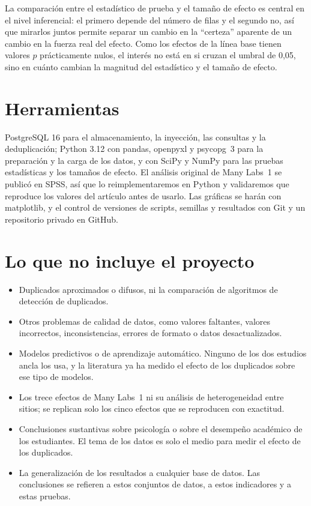 \documentclass[11pt,openany,oneside,letterpaper]{book}
\begin{document}
La comparación entre el estadístico de prueba y el tamaño de efecto es central en el nivel inferencial: el primero depende del número de filas y el segundo no, así que mirarlos juntos permite separar un cambio en la ``certeza'' aparente de un cambio en la fuerza real del efecto. Como los efectos de la línea base tienen valores $p$ prácticamente nulos, el interés no está en si cruzan el umbral de 0,05, sino en cuánto cambian la magnitud del estadístico y el tamaño de efecto.

\section{Herramientas}

PostgreSQL 16 para el almacenamiento, la inyección, las consultas y la deduplicación; Python 3.12 con pandas, openpyxl y psycopg~3 para la preparación y la carga de los datos, y con SciPy y NumPy para las pruebas estadísticas y los tamaños de efecto. El análisis original de Many Labs~1 se publicó en SPSS, así que lo reimplementaremos en Python y validaremos que reproduce los valores del artículo antes de usarlo. Las gráficas se harán con matplotlib, y el control de versiones de scripts, semillas y resultados con Git y un repositorio privado en GitHub.

\section{Lo que no incluye el proyecto}

\begin{itemize}
 \item Duplicados aproximados o difusos, ni la comparación de algoritmos de detección de duplicados.
 \item Otros problemas de calidad de datos, como valores faltantes, valores incorrectos, inconsistencias, errores de formato o datos desactualizados.
 \item Modelos predictivos o de aprendizaje automático. Ninguno de los dos estudios ancla los usa, y la literatura ya ha medido el efecto de los duplicados sobre ese tipo de modelos.
 \item Los trece efectos de Many Labs~1 ni su análisis de heterogeneidad entre sitios; se replican solo los cinco efectos que se reproducen con exactitud.
 \item Conclusiones sustantivas sobre psicología o sobre el desempeño académico de los estudiantes. El tema de los datos es solo el medio para medir el efecto de los duplicados.
 \item La generalización de los resultados a cualquier base de datos. Las conclusiones se refieren a estos conjuntos de datos, a estos indicadores y a estas pruebas.
\end{itemize}
\end{document}

